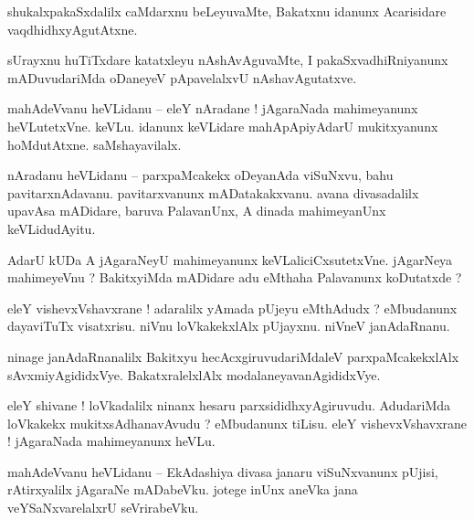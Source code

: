 \documentclass{article}
\begin{document}
\begin{mn}%
shukalxpakaSxdalilx caMdarxnu beLeyuvaMte, Bakatxnu idanunx Acarisidare vaqdhidhxyAgutAtxne.
\end{mn}

\begin{mn}%
sUrayxnu huTiTxdare katatxleyu nAshAvAguvaMte, I pakaSxvadhiRniyanunx mADuvudariMda oDaneyeV 
pApavelalxvU nAshavAgutatxve.
\end{mn}


\begin{mn}%
mahAdeVvanu heVLidanu -- eleY nAradane ! jAgaraNada mahimeyanunx heVLutetxVne. keVLu. idanunx 
keVLidare mahApApiyAdarU mukitxyanunx hoMdutAtxne. saMshayavilalx.
\end{mn}

\begin{mn}%
nAradanu heVLidanu -- parxpaMcakekx oDeyanAda viSuNxvu, bahu pavitarxnAdavanu. pavitarxvanunx 
mADatakakxvanu. avana divasadalilx upavAsa mADidare, baruva PalavanUnx, A dinada mahimeyanUnx 
keVLidudAyitu.
\end{mn}

\begin{mn}%
AdarU kUDa A jAgaraNeyU mahimeyanunx keVLaliciCxsutetxVne. jAgarNeya mahimeyeVnu ? BakitxyiMda 
mADidare adu eMthaha Palavanunx koDutatxde ?
\end{mn}

\begin{mn}%
eleY vishevxVshavxrane ! adaralilx yAmada pUjeyu eMthAdudx ? eMbudanunx dayaviTuTx visatxrisu. 
niVnu loVkakekxlAlx pUjayxnu. niVneV janAdaRnanu.
\end{mn}

\begin{mn}%
ninage janAdaRnanalilx Bakitxyu hecAcxgiruvudariMdaleV parxpaMcakekxlAlx sAvxmiyAgididxVye. 
BakatxralelxlAlx modalaneyavanAgididxVye.
\end{mn}

\begin{mn}%
eleY shivane ! loVkadalilx ninanx hesaru parxsididhxyAgiruvudu. AdudariMda loVkakekx 
mukitxsAdhanavAvudu ? eMbudanunx tiLisu. eleY vishevxVshavxrane ! jAgaraNada mahimeyanunx heVLu.
\end{mn}

\begin{mn}%
mahAdeVvanu heVLidanu -- EkAdashiya divasa janaru viSuNxvanunx pUjisi, rAtirxyalilx jAgaraNe 
mADabeVku. jotege inUnx aneVka jana veYSaNxvarelalxrU seVrirabeVku.
\end{mn}
\end{document}
